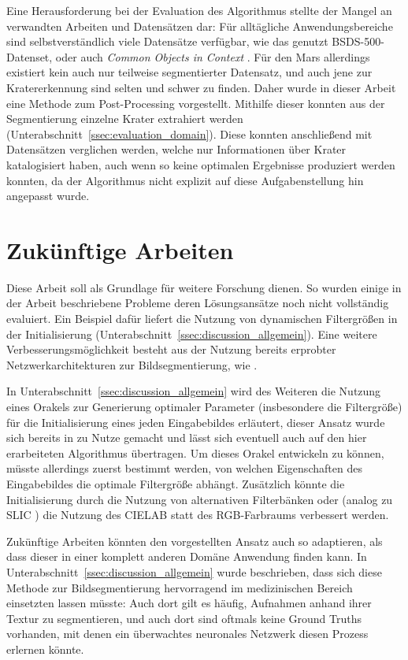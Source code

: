 Eine Herausforderung bei der Evaluation des Algorithmus stellte der Mangel an verwandten Arbeiten und Datensätzen dar: Für alltägliche Anwendungsbereiche sind selbstverständlich viele Datensätze verfügbar, wie das genutzt BSDS-500-Datenset, oder auch \textit{Common Objects in Context} \cite{lin_14}. Für den Mars allerdings existiert kein auch nur teilweise segmentierter Datensatz, und auch jene zur Kratererkennung sind selten und schwer zu finden. Daher wurde in dieser Arbeit eine Methode zum Post-Processing vorgestellt. Mithilfe dieser konnten aus der Segmentierung einzelne Krater extrahiert werden (\vgl Unterabschnitt~\ref{ssec:evaluation_domain}). Diese konnten anschließend mit Datensätzen verglichen werden, welche nur Informationen über Krater katalogisiert haben, auch wenn so keine optimalen Ergebnisse produziert werden konnten, da der Algorithmus nicht explizit auf diese Aufgabenstellung hin angepasst wurde.

\section{Zukünftige Arbeiten}

Diese Arbeit soll als Grundlage für weitere Forschung dienen. So wurden einige in der Arbeit beschriebene Probleme \bzw deren Lösungsansätze noch nicht vollständig evaluiert. Ein Beispiel dafür liefert die Nutzung von dynamischen Filtergrößen in der Initialisierung (\vgl Unterabschnitt~\ref{ssec:discussion_allgemein}). Eine weitere Verbesserungsmöglichkeit besteht aus der Nutzung bereits erprobter Netzwerkarchitekturen zur Bildsegmentierung, wie \bspw \cite{ronneberger_15}.

In Unterabschnitt~\ref{ssec:discussion_allgemein} wird des Weiteren die Nutzung eines Orakels zur Generierung optimaler Parameter (insbesondere die Filtergröße) für die Initialisierung eines jeden Eingabebildes erläutert, dieser Ansatz wurde sich bereits in \cite{arbelaez_10} zu Nutze gemacht und lässt sich eventuell auch auf den hier erarbeiteten Algorithmus übertragen. Um dieses Orakel entwickeln zu können, müsste allerdings zuerst bestimmt werden, von welchen Eigenschaften des Eingabebildes die optimale Filtergröße abhängt. Zusätzlich könnte die Initialisierung durch die Nutzung von alternativen Filterbänken oder (analog zu SLIC \cite{achanta_10}) die Nutzung des CIELAB statt des RGB-Farbraums verbessert werden.

Zukünftige Arbeiten könnten den vorgestellten Ansatz auch so adaptieren, als dass dieser in einer komplett anderen Domäne Anwendung finden kann. In Unterabschnitt~\ref{ssec:discussion_allgemein} wurde beschrieben, dass sich diese Methode zur Bildsegmentierung hervorragend im medizinischen Bereich einsetzten lassen müsste: Auch dort gilt es häufig, Aufnahmen anhand ihrer Textur zu segmentieren, und auch dort sind oftmals keine Ground Truths vorhanden, mit denen ein überwachtes neuronales Netzwerk diesen Prozess erlernen könnte.

